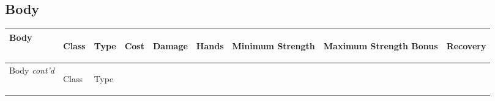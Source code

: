 \documentclass[twoside]{book}
\begin{document}
\begin{multicols}{2}
    \hspace{-2ex}


\vspace{1ex}


    
\end{multicols}
  
    

\subsection{Body}
    
\begin{longtable}{p{1.25in}llllp{2em}p{3em}p{3em}l} 
  Body
  &
  \begin{turn}{70}{Class}\end{turn}
          
  &
  \begin{turn}{70}{Type}\end{turn}
          
  &
  \begin{turn}{70}{Cost}\end{turn}
          
  &
  \begin{turn}{70}{Damage}\end{turn}
          
  &
  \begin{turn}{70}{Hands}\end{turn}
          
  &
  \begin{turn}{70}{Minimum Strength}\end{turn}
          
  &
  \begin{turn}{70}{Maximum Strength Bonus}\end{turn}
          
  &
  \begin{turn}{70}{Recovery}\end{turn}
          
  \\
  \hline
  \hline
  \endfirsthead
  Body \textit{cont'd}
        
  &
  \begin{turn}{70}{Class}\end{turn}
          
  &
  \begin{turn}{70}{Type}\end{turn}
          

\end{longtable}
\end{document}

